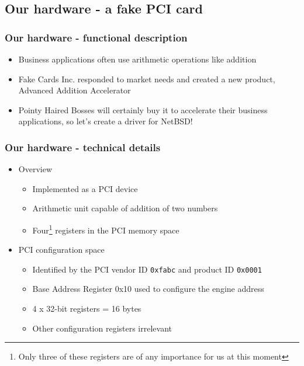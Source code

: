 \documentclass[dvipsnames,table]{beamer}
\begin{document}
\subsection{Our hardware - a fake PCI card}

\begin{frame}
\frametitle{Our hardware - functional description}
\begin{itemize}
	\item Business applications often use arithmetic operations like addition
	\item Fake Cards Inc. responded to market needs and created a new product, Advanced Addition Accelerator
	\item Pointy Haired Bosses will certainly buy it to accelerate their business applications, so let's create a driver for NetBSD!
\end{itemize}
\end{frame}

\begin{frame}
\frametitle{Our hardware - technical details}
\begin{itemize}
\item Overview
\begin{itemize}
	\item Implemented as a PCI device
	\item Arithmetic unit capable of addition of two numbers
	\item Four\footnote{Only three of these registers are of any importance for us at this moment} registers in the PCI memory space
\end{itemize}
\item PCI configuration space
\begin{itemize}
	\item Identified by the PCI vendor ID {\tt 0xfabc} and product ID {\tt 0x0001}
	\item Base Address Register 0x10 used to configure the engine address 
	\item 4 x 32-bit registers = 16 bytes
	\item Other configuration registers irrelevant
\end{itemize}
\end{itemize}
\end{frame}
\end{document}
